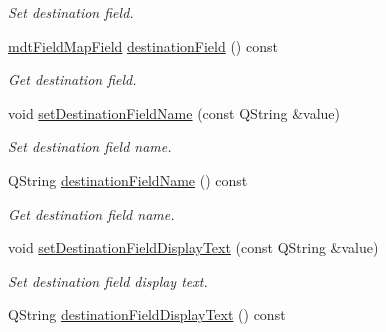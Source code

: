 \begin{DoxyCompactItemize}
\begin{DoxyCompactList}\small\item\em Set destination field. \end{DoxyCompactList}\item 
\hypertarget{classmdt_field_map_item_a1a76d3726880571895c5d90f9082c0cf}{
\hyperlink{classmdt_field_map_field}{mdtFieldMapField} \hyperlink{classmdt_field_map_item_a1a76d3726880571895c5d90f9082c0cf}{destinationField} () const }
\label{classmdt_field_map_item_a1a76d3726880571895c5d90f9082c0cf}

\begin{DoxyCompactList}\small\item\em Get destination field. \end{DoxyCompactList}\item 
\hypertarget{classmdt_field_map_item_afd58131972b117c56b73f4466d7b508f}{
void \hyperlink{classmdt_field_map_item_afd58131972b117c56b73f4466d7b508f}{setDestinationFieldName} (const QString \&value)}
\label{classmdt_field_map_item_afd58131972b117c56b73f4466d7b508f}

\begin{DoxyCompactList}\small\item\em Set destination field name. \end{DoxyCompactList}\item 
\hypertarget{classmdt_field_map_item_a0950eb6ad45c1e1c3068f8c27e0363e8}{
QString \hyperlink{classmdt_field_map_item_a0950eb6ad45c1e1c3068f8c27e0363e8}{destinationFieldName} () const }
\label{classmdt_field_map_item_a0950eb6ad45c1e1c3068f8c27e0363e8}

\begin{DoxyCompactList}\small\item\em Get destination field name. \end{DoxyCompactList}\item 
\hypertarget{classmdt_field_map_item_a3378daa266d132501e6a3feb9cf6ebf8}{
void \hyperlink{classmdt_field_map_item_a3378daa266d132501e6a3feb9cf6ebf8}{setDestinationFieldDisplayText} (const QString \&value)}
\label{classmdt_field_map_item_a3378daa266d132501e6a3feb9cf6ebf8}

\begin{DoxyCompactList}\small\item\em Set destination field display text. \end{DoxyCompactList}\item 
\hypertarget{classmdt_field_map_item_a8ea2ad8c7b3fdf22a140560a4fc93094}{
QString \hyperlink{classmdt_field_map_item_a8ea2ad8c7b3fdf22a140560a4fc93094}{destinationFieldDisplayText} () const }
\label{classmdt_field_map_item_a8ea2ad8c7b3fdf22a140560a4fc93094}


\end{DoxyCompactItemize}
